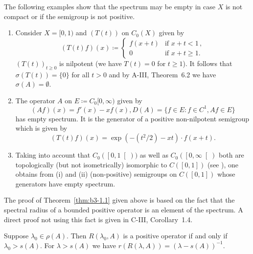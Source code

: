 The following examples show that the spectrum may be empty in case $X$ is not compact or if the semigroup is not positive.
\begin{examples}\label{ex:b3-1.2}
%

\begin{enumerate}[\upshape (i), wide, labelindent=.5em]	
\item  
Consider $X = [0,1)$ and $(T(t))$ on $C_{0}(X)$ given by
%
\begin{equation}\label{eq:b3-1.7}
	(T(t)f)(x) \coloneqq \begin{cases} 
		f(x+t) & \text{if } x+t < 1\,, \\
		0 & \text{if } x+t \geq 1.
	\end{cases}
\end{equation}
$(T(t))_{t\geq 0}$ is nilpotent (we have $T(t) = 0$ for $t \geq 1$).
It follows that $\sigma(T(t)) = \{0\}$ for all $t > 0$ and by A-III, Theorem~6.2 we have $\sigma(A) = \emptyset$.

\item 
The operator $A$ on $E \coloneqq C_{0}[0,\infty)$ given by
\begin{equation}\label{eq:b3-1.8}
	(Af)(x) = f'(x) - xf(x), D(A) = \{f \in E \colon f \in C^1, Af \in E\}
\end{equation}
has empty spectrum.
It is the generator of a positive non-nilpotent semigroup which is given by
\begin{equation}\label{eq:b3-1.9}
	(T(t)f)(x) = \exp(-(t^2/2) - xt) \cdot f(x+t).
\end{equation}
	
\item 
Taking into account that $C_{0}(\left[0,1\right[))$ as well as 
$C_{0}(\left[0,\infty\right[)$ both are topologically (but not isometrically) isomorphic to $C(\left[0,1\right])$ (see \citet[Section~21.5]{semadeni:1971}), one obtains from (i) and (ii) (non-positive) semigroups on $C(\left[0,1\right])$ whose generators have empty spectrum.
\end{enumerate}
\end{examples}
The proof of Theorem~\ref{thm:b3-1.1} given above is based on the fact that the spectral radius of a bounded positive operator is an element of the spectrum.
A direct proof not using this fact is given in C-III, Corollary~1.4.
\begin{corollary}\label{cor:b3-1.3}
	Suppose $\lambda_0 \in \rho(A)$.
	Then $R(\lambda_0,A)$ is a positive operator if and only if $\lambda_0 > s(A)$.
	For $\lambda > s(A)$ we have $r(R(\lambda,A)) = (\lambda - s(A))^{-1}$.
\end{corollary}
